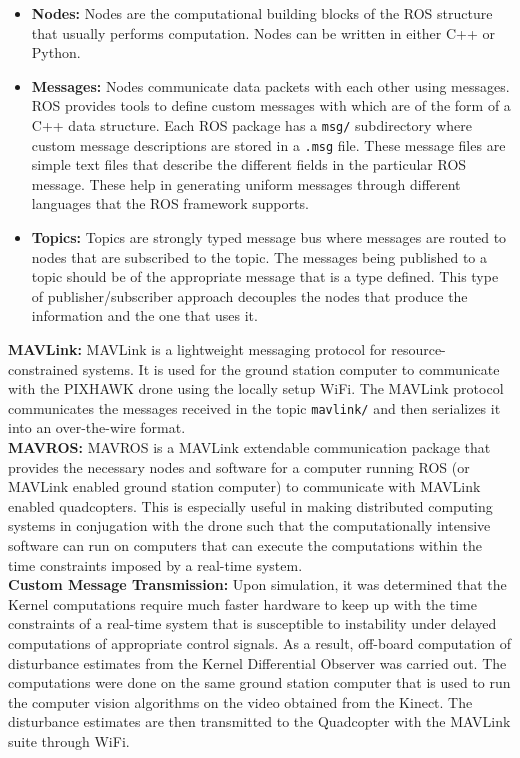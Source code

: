 \documentclass[letterpaper%
, twoside%
, 12pt%
,memoire%
, english%
,creativecommons,hyperref%
]{thETS}
\begin{document}
\begin{itemize}
	\item \textbf{Nodes:} Nodes are the computational building blocks of the ROS structure that usually performs computation. Nodes can be written in either C++ or Python. 
	\item \textbf{Messages:} Nodes communicate data packets with each other using messages. ROS provides tools to define custom messages with which are of the form of a C++ data structure. Each ROS package has a \texttt{msg/} subdirectory where custom message descriptions are stored in a \texttt{.msg} file. These message files are simple text files that describe the different fields in the particular ROS message. These help in generating uniform messages through different languages that the ROS framework supports. 
	\item \textbf{Topics:} Topics are strongly typed message bus where messages are routed to nodes that are subscribed to the topic. The messages being published to a topic should be of the appropriate message that is a type defined. This type of publisher/subscriber approach decouples the nodes that produce the information and the one that uses it. 
\end{itemize}
\textbf{MAVLink:} MAVLink is a lightweight messaging protocol for resource-constrained systems. It is used for the ground station computer to communicate with the PIXHAWK drone using the locally setup WiFi. The MAVLink protocol communicates the messages received in the topic \texttt{mavlink/} and then serializes it into an over-the-wire format.\\
\textbf{MAVROS:} MAVROS is a MAVLink extendable communication package that provides the necessary nodes and software for a computer running ROS (or MAVLink enabled ground station computer) to communicate with MAVLink enabled quadcopters. This is especially useful in making distributed computing systems in conjugation with the drone such that the computationally intensive software can run on computers that can execute the computations within the time constraints imposed by a real-time system.\\
\textbf{Custom Message Transmission:} Upon simulation, it was determined that the Kernel computations require much faster hardware to keep up with the time constraints of a real-time system that is susceptible to instability under delayed computations of appropriate control signals. As a result, off-board computation of disturbance estimates from the Kernel Differential Observer was carried out. The computations were done on the same ground station computer that is used to run the computer vision algorithms on the video obtained from the Kinect. The disturbance estimates are then transmitted to the Quadcopter with the MAVLink suite through WiFi.
\end{document}

